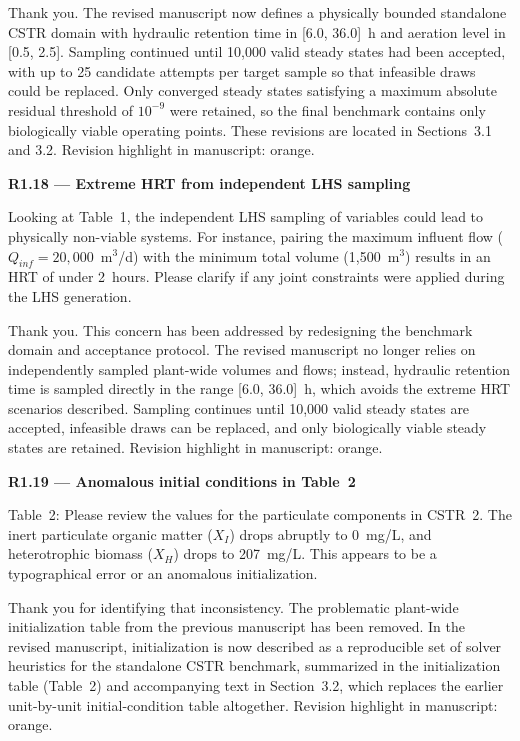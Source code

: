 \documentclass[a4paper,11pt]{article}
\newcommand{\reviewlabel}[1]{\noindent\textbf{\textcolor{accentblue}{#1}}\par\medskip}
\newcommand{\revhighlight}[2]{\textcolor{#1}{Revision highlight in manuscript: #2.}}
\begin{document}
Thank you. The revised manuscript now defines a physically bounded standalone CSTR domain with hydraulic retention time in [6.0, 36.0]~h and aeration level in [0.5, 2.5]. Sampling continued until 10,000 valid steady states had been accepted, with up to 25 candidate attempts per target sample so that infeasible draws could be replaced. Only converged steady states satisfying a maximum absolute residual threshold of $10^{-9}$ were retained, so the final benchmark contains only biologically viable operating points. These revisions are located in Sections~3.1 and 3.2. \revhighlight{revRoneSixteen}{orange}

\reviewlabel{R1.18 --- Extreme HRT from independent LHS sampling}
\begin{reviewbox}
Looking at Table~1, the independent LHS sampling of variables could lead to physically non-viable systems. For instance, pairing the maximum influent flow ($Q_{inf} = 20{,}000$~m$^3$/d) with the minimum total volume (1,500~m$^3$) results in an HRT of under 2~hours. Please clarify if any joint constraints were applied during the LHS generation.
\end{reviewbox}

Thank you. This concern has been addressed by redesigning the benchmark domain and acceptance protocol. The revised manuscript no longer relies on independently sampled plant-wide volumes and flows; instead, hydraulic retention time is sampled directly in the range [6.0, 36.0]~h, which avoids the extreme HRT scenarios described. Sampling continues until 10,000 valid steady states are accepted, infeasible draws can be replaced, and only biologically viable steady states are retained. \revhighlight{revRoneSixteen}{orange}

\reviewlabel{R1.19 --- Anomalous initial conditions in Table~2}
\begin{reviewbox}
Table~2: Please review the values for the particulate components in CSTR~2. The inert particulate organic matter ($X_I$) drops abruptly to 0~mg/L, and heterotrophic biomass ($X_H$) drops to 207~mg/L. This appears to be a typographical error or an anomalous initialization.
\end{reviewbox}

Thank you for identifying that inconsistency. The problematic plant-wide initialization table from the previous manuscript has been removed. In the revised manuscript, initialization is now described as a reproducible set of solver heuristics for the standalone CSTR benchmark, summarized in the initialization table (Table~2) and accompanying text in Section~3.2, which replaces the earlier unit-by-unit initial-condition table altogether. \revhighlight{revRoneSixteen}{orange}
\end{document}
